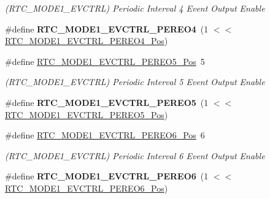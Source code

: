 \begin{DoxyCompactItemize}
\begin{DoxyCompactList}\small\item\em (R\+T\+C\+\_\+\+M\+O\+D\+E1\+\_\+\+E\+V\+C\+T\+R\+L) Periodic Interval 4 Event Output Enable \end{DoxyCompactList}\item 
\hypertarget{group___s_a_m_l21___r_t_c_ga4989c499d3e8368b619834a52b7f29ec}{}\#define {\bfseries R\+T\+C\+\_\+\+M\+O\+D\+E1\+\_\+\+E\+V\+C\+T\+R\+L\+\_\+\+P\+E\+R\+E\+O4}~(1 $<$$<$ \hyperlink{group___s_a_m_l21___r_t_c_gab38f490e7a1f446ef89cf863a8a476b7}{R\+T\+C\+\_\+\+M\+O\+D\+E1\+\_\+\+E\+V\+C\+T\+R\+L\+\_\+\+P\+E\+R\+E\+O4\+\_\+\+Pos})\label{group___s_a_m_l21___r_t_c_ga4989c499d3e8368b619834a52b7f29ec}

\item 
\hypertarget{group___s_a_m_l21___r_t_c_ga15489f084396f9a5f69fb7ac3b7d8a78}{}\#define \hyperlink{group___s_a_m_l21___r_t_c_ga15489f084396f9a5f69fb7ac3b7d8a78}{R\+T\+C\+\_\+\+M\+O\+D\+E1\+\_\+\+E\+V\+C\+T\+R\+L\+\_\+\+P\+E\+R\+E\+O5\+\_\+\+Pos}~5\label{group___s_a_m_l21___r_t_c_ga15489f084396f9a5f69fb7ac3b7d8a78}

\begin{DoxyCompactList}\small\item\em (R\+T\+C\+\_\+\+M\+O\+D\+E1\+\_\+\+E\+V\+C\+T\+R\+L) Periodic Interval 5 Event Output Enable \end{DoxyCompactList}\item 
\hypertarget{group___s_a_m_l21___r_t_c_gac5ef1cae0384e5e5d0e9dcfed0cbd361}{}\#define {\bfseries R\+T\+C\+\_\+\+M\+O\+D\+E1\+\_\+\+E\+V\+C\+T\+R\+L\+\_\+\+P\+E\+R\+E\+O5}~(1 $<$$<$ \hyperlink{group___s_a_m_l21___r_t_c_ga15489f084396f9a5f69fb7ac3b7d8a78}{R\+T\+C\+\_\+\+M\+O\+D\+E1\+\_\+\+E\+V\+C\+T\+R\+L\+\_\+\+P\+E\+R\+E\+O5\+\_\+\+Pos})\label{group___s_a_m_l21___r_t_c_gac5ef1cae0384e5e5d0e9dcfed0cbd361}

\item 
\hypertarget{group___s_a_m_l21___r_t_c_gad6aedea788d39247d27be9fc8e6e448d}{}\#define \hyperlink{group___s_a_m_l21___r_t_c_gad6aedea788d39247d27be9fc8e6e448d}{R\+T\+C\+\_\+\+M\+O\+D\+E1\+\_\+\+E\+V\+C\+T\+R\+L\+\_\+\+P\+E\+R\+E\+O6\+\_\+\+Pos}~6\label{group___s_a_m_l21___r_t_c_gad6aedea788d39247d27be9fc8e6e448d}

\begin{DoxyCompactList}\small\item\em (R\+T\+C\+\_\+\+M\+O\+D\+E1\+\_\+\+E\+V\+C\+T\+R\+L) Periodic Interval 6 Event Output Enable \end{DoxyCompactList}\item 
\hypertarget{group___s_a_m_l21___r_t_c_gaabc098c6ecf1aba7ae15c3db1ffc34b2}{}\#define {\bfseries R\+T\+C\+\_\+\+M\+O\+D\+E1\+\_\+\+E\+V\+C\+T\+R\+L\+\_\+\+P\+E\+R\+E\+O6}~(1 $<$$<$ \hyperlink{group___s_a_m_l21___r_t_c_gad6aedea788d39247d27be9fc8e6e448d}{R\+T\+C\+\_\+\+M\+O\+D\+E1\+\_\+\+E\+V\+C\+T\+R\+L\+\_\+\+P\+E\+R\+E\+O6\+\_\+\+Pos})\label{group___s_a_m_l21___r_t_c_gaabc098c6ecf1aba7ae15c3db1ffc34b2}


\end{DoxyCompactItemize}
